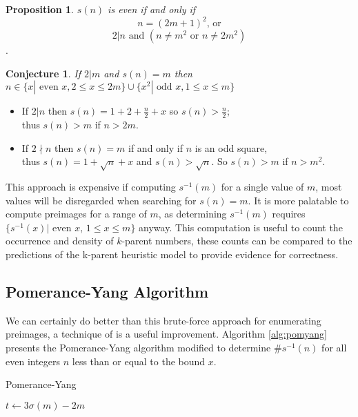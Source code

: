 \documentclass{article}
\theoremstyle{definition}
\newtheorem{conjecture}{Conjecture}[section]
\newtheorem{proposition}{Proposition}[section]
\begin{document}
\begin{proposition} \textit{$s(n)$ is even if and only if}
    $$n = (2m+1)^2 \text{, or}$$
    $$2 | n \text{ and } (n \neq m^2 \text{ or } n \neq 2m^2)$$.
\end{proposition}

\begin{conjecture} \textit{If $2 | m$ and $s(n) = m$ then $n \in \{x| \text{ even } x, 2 \leq x \leq 2m \} \cup \{x^2| \text{ odd } x, 1 \leq x \leq m\}$}
    \begin{itemize}
        \item If $2 | n$ then $s(n) = 1+ 2 + \frac{n}{2} + x $ so $s(n) > \frac{n}{2}$;\\
              thus $s(n) > m$ if $n > 2m$.

        \item If $2 \nmid n$ then $s(n) = m$ if and only if $n$ is an odd square,\\
              thus $s(n) = 1 + \sqrt{n} + x$ and $s(n) > \sqrt{n}$. So $s(n) > m$ if $n > m^2$.

    \end{itemize}
\end{conjecture}

This approach is expensive if computing $s^{-1}(m)$ for a single value of $m$, most values will be disregarded when searching for $s(n) = m$. It is more palatable to compute preimages for a range of $m$, as determining $s^{-1}(m)$ requires $\{s^{-1}(x)|\text{ even } x,\, 1 \leq x \leq m\}$ anyway. This computation is useful to count the occurrence and density of $k$-parent numbers, these counts can be compared to the predictions of the k-parent heuristic model to provide evidence for correctness.

\subsection{Pomerance-Yang Algorithm}
We can certainly do better than this brute-force approach for enumerating preimages, a technique of \cite{pomYang} is a useful improvement. Algorithm \ref{alg:pomyang} presents the Pomerance-Yang algorithm modified to determine $\#s^{-1}(n)$ for all even integers $n$ less than or equal to the bound $x$.

\begin{algorithm}[]
    \caption{Pomerance-Yang}
    \label{alg:pomyang}
    \begin{algorithmic}[1]
        \State $t \gets 3\sigma(m) - 2m$
        \EndWhile
        \EndIf
         
        \EndIf
        \EndFor
        \ForAll{odd composite $m \in [1, x^{2/3})$}
        \EndIf
        \EndFor
        \EndProcedure
    \end{algorithmic}
\end{algorithm}
\end{document}
